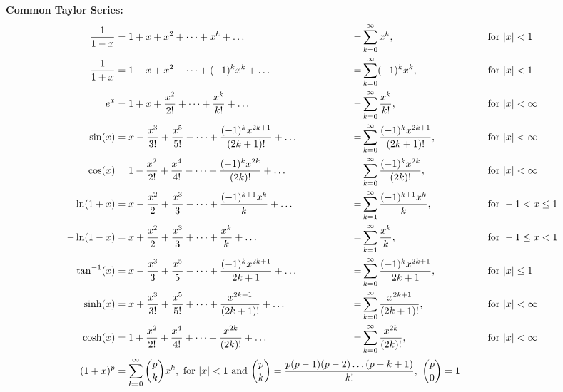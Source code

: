 \documentclass{exam}
\newcommand*{\abs}[1]{{\left\vert#1\right\vert}}
\newcommand*{\inv}[1][1]{^{-#1}}
\begin{document}
  \noindent\textbf{Common Taylor Series:}
  \addtolength{\jot}{0.675\baselineskip}
  \begin{alignat*}{4}
    \frac{1}{1-x}&= 1+x+x^2+\dots+x^k+\dots\hspace*{35mm}&=&\sum_{k=0}^\infty x^k,&\hspace*{40pt}&\textnormal{ for }\abs{x}<1\\
    \frac{1}{1+x}&= 1-x+x^2-\dots+(-1)^kx^k+\dots\ &=&\sum_{k=0}^\infty (-1)^k x^k,&&\textnormal{ for }\abs{x}<1\\
    e^x&=1+x+\frac{x^2}{2!}+\dots+\frac{x^k}{k!}+\dots\ &=&\sum_{k=0}^\infty \frac{x^k}{k!},&&\textnormal{ for }\abs{x}<\infty\\
    \sin(x)&=x-\frac{x^3}{3!}+\frac{x^5}{5!}-\dots+\frac{(-1)^k x^{2k+1}}{(2k+1)!}+\dots\ &=&\sum_{k=0}^\infty \frac{(-1)^k x^{2k+1}}{(2k+1)!},&&\textnormal{ for } \abs{x}<\infty\\
    \cos(x)&=1-\frac{x^2}{2!}+\frac{x^4}{4!}-\dots+\frac{(-1)^k x^{2k}}{(2k)!}+\dots\ &=&\sum_{k=0}^\infty \frac{(-1)^k x^{2k}}{(2k)!},&&\textnormal{ for } \abs{x}<\infty\\
    \ln(1+x)&=x-\frac{x^2}{2}+\frac{x^3}{3}-\dots+\frac{(-1)^{k+1}x^k}{k}+\dots\ &=&\sum_{k=1}^\infty \frac{(-1)^{k+1}x^k}{k},&&\textnormal{ for } -1<x\leq 1\\
    -\ln(1-x)&=x+\frac{x^2}{2}+\frac{x^3}{3}+\dots+\frac{x^k}{k}+\dots\ &=&\sum_{k=1}^\infty \frac{x^k}{k},&&\textnormal{ for } -1\leq x< 1\\
    \tan\inv(x)&=x-\frac{x^3}{3}+\frac{x^5}{5}-\dots+\frac{(-1)^k x^{2k+1}}{2k+1}+\dots\ &=&\sum_{k=0}^\infty \frac{(-1)^k x^{2k+1}}{2k+1},&&\textnormal{ for } \abs{x}\leq 1\\
    \sinh(x)&= x+\frac{x^3}{3!}+\frac{x^5}{5!}+\dots+ \frac{x^{2k+1}}{(2k+1)!}+\dots\ &=&\sum_{k=0}^\infty \frac{x^{2k+1}}{(2k+1)!},&&\textnormal{ for } \abs{x}<\infty\\
    \cosh(x)&= 1+\frac{x^2}{2!}+\frac{x^4}{4!}+\dots+ \frac{x^{2k}}{(2k)!}+\dots\ &=&\sum_{k=0}^\infty \frac{x^{2k}}{(2k)!},&&\textnormal{ for } \abs{x}<\infty\\
    (1+x)^p&=\sum_{k=0}^\infty {p\choose k} x^k, \textnormal{ for } \abs{x}<1 \textnormal{ and } \mathrlap{{p\choose k}=\frac{p(p-1)(p-2)\dots(p-k+1)}{k!},\ {p\choose 0}=1}
  \end{alignat*}
\end{document}
